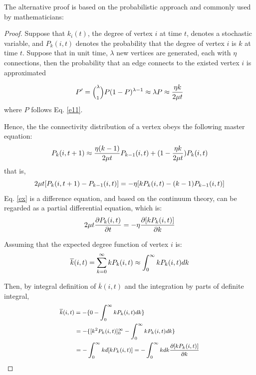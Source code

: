 \documentclass[final]{IEEEtran}
\begin{document}
The alternative proof is based on the probabilistic approach and
commonly used by mathematicians:

\begin{proof}
Suppose that $k_{i}(t)$, the degree of vertex $i$ at time $t$,
denotes a stochastic variable, and $P_{k}(i,t)$ denotes the
probability that the degree of vertex $i$ is $k$ at time $t$.
Suppose that in unit time, $\lambda$ new vertices are generated,
each with $\eta$ connections, then the probability that an edge
connects to the existed vertex $i$ is approximated

\begin{equation}\footnotesize
P'=\Big(^{\lambda}_{1}\Big ) P(1-P)^{\lambda-1}\approx \lambda P
\approx \frac{\eta k}{2\mu t}
\end{equation}
where $P$ follows Eq. \ref{e11}.

Hence, the the connectivity distribution of a vertex obeys the
following master equation:
\begin{equation}\footnotesize
P_{k}(i, t+1)\approx \frac{\eta (k-1)}{2\mu
t}P_{k-1}(i,t)+(1-\frac{\eta k}{2\mu t})P_{k}(i,t)
\end{equation}
that is,
\begin{equation}\label{ex}\footnotesize
2\mu t[P_{k}(i, t+1)-P_{k-1}(i,t)]=-\eta [kP_{k}(i,
t)-(k-1)P_{k-1}(i,t)]
\end{equation}
Eq. \ref{ex} is a difference equation, and based on the continuum
theory, can be regarded as a partial differential equation, which
is:
\begin{equation}\label{e3}\footnotesize
2\mu t\frac{\partial P_{k}(i, t)}{\partial t}=-\eta\frac{\partial
[kP_{k}(i, t)]}{\partial k}
\end{equation}

Assuming that the expected degree function of vertex $i$ is:
\begin{equation}\footnotesize
\overline{k}(i,t)=\sum\limits_{k=0}^{\infty}kP_{k}(i,t)\approx\int_{0}^{\infty}kP_{k}(i,t)dk
\end{equation}

Then, by integral definition of $\overline{k}(i,t)$ and the
integration by parts of definite integral,
\begin{equation}\label{e4}\footnotesize
\begin{aligned}
&\hspace{0cm} \overline{k}(i,t)=-\{0-\int_{0}^{\infty}kP_{k}(i,t)dk\}\\
&\hspace{0.75cm}
=-\{[k^{2}P_{k}(i,t)]_{0}^{\infty}-\int_{0}^{\infty}kP_{k}(i,t)dk\}\\
&\hspace{0.75cm}
=-\int_{0}^{\infty}kd[kP_{k}(i,t)]=-\int_{0}^{\infty}kdk\frac{\partial
[kP_{k}(i, t)]}{\partial k}
\end{aligned}
\end{equation}



\end{proof}
\end{document}
